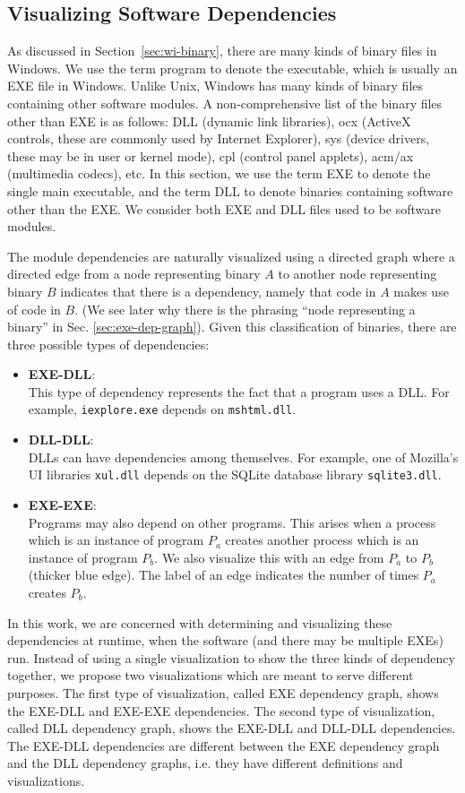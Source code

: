 \subsection{Visualizing Software Dependencies}

As discussed in Section~\ref{sec:wi-binary},
there are many kinds of binary files in Windows.
We use the term program to denote the executable, which
is usually an EXE file in Windows.
Unlike Unix, Windows has many kinds of binary files containing
other software modules.
A non-comprehensive list of the binary files other than EXE
is as follows:
DLL (dynamic link libraries), ocx (ActiveX controls,
these are commonly used by Internet Explorer), sys (device
drivers, these may be in user or kernel mode), cpl (control panel applets),
acm/ax (multimedia codecs), etc.
In this section, we use the term EXE to denote the single main executable,
and the term DLL to denote binaries containing software other than the EXE.
We consider both EXE and DLL files used to be software modules.

The module dependencies are naturally visualized using a directed graph where
a directed edge from a node representing binary $A$ to another
node representing binary $B$ indicates that there is
a dependency, namely that code in $A$ makes use of code in $B$.
(We see later why there is the phrasing ``node representing a binary'' in
Sec. \ref{sec:exe-dep-graph}).
Given this classification of binaries, there are three possible
types of dependencies:
\begin{itemize}
\item {\bf EXE-DLL}: \\
This type of dependency represents the fact that a program uses a DLL.
For example, {\tt iexplore.exe} depends on {\tt mshtml.dll}.
\item {\bf DLL-DLL}: \\
DLLs can have dependencies among themselves.
For example, one of Mozilla's UI libraries {\tt xul.dll} depends on the SQLite
database library {\tt sqlite3.dll}.
\item {\bf EXE-EXE}: \\
Programs may also depend on other programs. This arises when a process
which is an instance of program $P_a$ creates another process
which is an instance of program $P_b$.
We also visualize this with an edge from $P_a$ to $P_b$ (thicker blue edge).
The label of an edge indicates the number of times $P_a$ creates $P_b$.
\end{itemize}

In this work, we are concerned with determining and visualizing these
dependencies at runtime, when the software (and there may be multiple
EXEs) run.
Instead of using a single visualization to show the three kinds of dependency
together, we propose two visualizations which are meant
to serve different purposes.
The first type of visualization, called EXE dependency graph,
shows the EXE-DLL and EXE-EXE dependencies.
The second type of visualization, called DLL dependency graph,
shows the EXE-DLL and DLL-DLL dependencies.
The EXE-DLL dependencies are different between the EXE dependency
graph and the DLL dependency graphs, i.e. they have different definitions
and visualizations.

